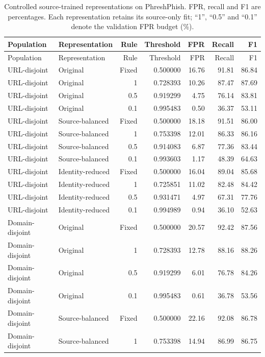 \documentclass[10pt]{article}
\newenvironment{bluechange}{\color{black}}{}
\begin{document}
\begin{bluechange}
\begin{longtable}{llrrrrr}
\caption{\color{black}Controlled source-trained representations on PhreshPhish. FPR, recall and F1 are percentages. Each representation retains its source-only fit; ``1'', ``0.5'' and ``0.1'' denote the validation FPR budget (\%).}\label{tab:phresh_controlled}\\
\toprule
Population & Representation & Rule & Threshold & FPR & Recall & F1 \\
\midrule
\endfirsthead
\toprule Population & Representation & Rule & Threshold & FPR & Recall & F1 \\
\midrule\endhead
URL-disjoint & Original & Fixed & 0.500000 & 16.76 & 91.81 & 86.84 \\
URL-disjoint & Original & 1 & 0.728393 & 10.26 & 87.47 & 87.69 \\
URL-disjoint & Original & 0.5 & 0.919299 & 4.75 & 76.14 & 83.81 \\
URL-disjoint & Original & 0.1 & 0.995483 & 0.50 & 36.37 & 53.11 \\
URL-disjoint & Source-balanced & Fixed & 0.500000 & 18.18 & 91.51 & 86.00 \\
URL-disjoint & Source-balanced & 1 & 0.753398 & 12.01 & 86.33 & 86.16 \\
URL-disjoint & Source-balanced & 0.5 & 0.914083 & 6.87 & 77.36 & 83.44 \\
URL-disjoint & Source-balanced & 0.1 & 0.993603 & 1.17 & 48.39 & 64.63 \\
URL-disjoint & Identity-reduced & Fixed & 0.500000 & 16.04 & 89.04 & 85.68 \\
URL-disjoint & Identity-reduced & 1 & 0.725851 & 11.02 & 82.48 & 84.42 \\
URL-disjoint & Identity-reduced & 0.5 & 0.931471 & 4.97 & 67.31 & 77.76 \\
URL-disjoint & Identity-reduced & 0.1 & 0.994989 & 0.94 & 36.10 & 52.63 \\
Domain-disjoint & Original & Fixed & 0.500000 & 20.57 & 92.42 & 87.56 \\
Domain-disjoint & Original & 1 & 0.728393 & 12.78 & 88.16 & 88.26 \\
Domain-disjoint & Original & 0.5 & 0.919299 & 6.01 & 76.78 & 84.26 \\
Domain-disjoint & Original & 0.1 & 0.995483 & 0.61 & 36.78 & 53.56 \\
Domain-disjoint & Source-balanced & Fixed & 0.500000 & 22.16 & 92.08 & 86.78 \\
Domain-disjoint & Source-balanced & 1 & 0.753398 & 14.94 & 86.99 & 86.75 \\

\end{longtable}
\end{bluechange}
\end{document}
